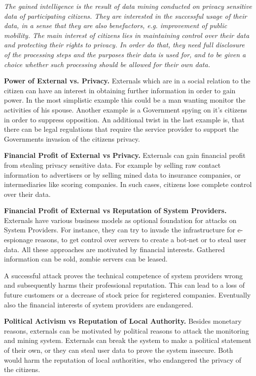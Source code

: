\documentclass[runningheads,a4paper]{llncs}
\newenvironment{LGContent}
{ \par\color{blue} \it \small }
{ \par }
\begin{document}
\begin{LGContent}
The gained intelligence is the result of data mining conducted on privacy sensitive data of participating citizens.
They are interested in the successful usage of their data, in a sense that they are also benefactors, e.g. improvement of public mobility.
The main interest of citizens lies in maintaining control over their data and protecting their rights to privacy.
In order do that, they need full disclosure of the processing steps and the purposes their data is used for, and to be given a choice whether such processing should be allowed for their own data.

\textbf{Power of External vs. Privacy.}
Externals which are in a social relation to the citizen can have an interest in obtaining further information in order to gain power.
In the most simplistic example this could be a man wanting monitor the activities of his spouse.
Another example is a Government spying on it's citizens in order to suppress opposition.
An additional twist in the last example is, that there can be legal regulations that require the service provider to support the Governments invasion of the citizens privacy.

\textbf{Financial Profit of External vs Privacy.}
Externals can gain financial profit from stealing privacy sensitive data.
For example by selling raw contact information to advertisers or by selling mined data to insurance companies, or intermediaries like scoring companies.
In such cases, citizens lose complete control over their data.

\textbf{Financial Profit of External vs Reputation of System Providers.}
Externals have various business models as optional foundation for attacks on System Providers.
For instance, they can try to invade the infrastructure for e-espionage reasons, to get control over servers to create a bot-net or to steal user data.
All these approaches are motivated by financial interests.
Gathered information can be sold, zombie servers can be leased.

A successful attack proves the technical competence of system providers wrong and subsequently harms their professional reputation.
This can lead to a loss of future customers or a decrease of stock price for registered companies.
Eventually also the financial interests of system providers are endangered.

\textbf{Political Activism vs Reputation of Local Authority.}
Besides monetary reasons, externals can be motivated by political reasons to attack the monitoring and mining system.
Externals can break the system to make a political statement of their own,
or they can steal user data to prove the system insecure.
Both would harm the reputation of local authorities, who endangered the privacy of the citizens.



\end{LGContent}
\end{document}
